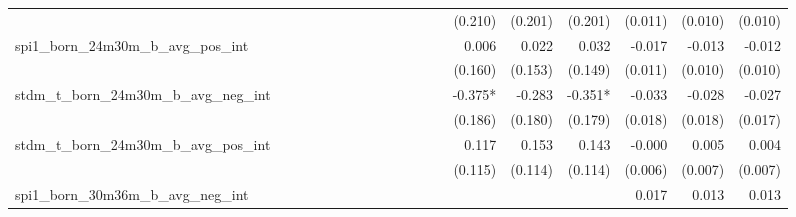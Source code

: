 \begin{tabular}{lrrrrrrrrrrrrrrrrrr}
                                            &              &              &              &              &              &              &              &              &               &              &              &               &      (0.210) &      (0.201) &       (0.201) &      (0.011) &      (0.010) &       (0.010) \\ 
spi1\_born\_24m30m\_b\_avg\_pos\_int        &              &              &              &              &              &              &              &              &               &              &              &               &        0.006 &        0.022 &         0.032 &       -0.017 &       -0.013 &        -0.012 \\ 
                                            &              &              &              &              &              &              &              &              &               &              &              &               &      (0.160) &      (0.153) &       (0.149) &      (0.011) &      (0.010) &       (0.010) \\ 
stdm\_t\_born\_24m30m\_b\_avg\_neg\_int     &              &              &              &              &              &              &              &              &               &              &              &               &      -0.375* &       -0.283 &       -0.351* &       -0.033 &       -0.028 &        -0.027 \\ 
                                            &              &              &              &              &              &              &              &              &               &              &              &               &      (0.186) &      (0.180) &       (0.179) &      (0.018) &      (0.018) &       (0.017) \\ 
stdm\_t\_born\_24m30m\_b\_avg\_pos\_int     &              &              &              &              &              &              &              &              &               &              &              &               &        0.117 &        0.153 &         0.143 &       -0.000 &        0.005 &         0.004 \\ 
                                            &              &              &              &              &              &              &              &              &               &              &              &               &      (0.115) &      (0.114) &       (0.114) &      (0.006) &      (0.007) &       (0.007) \\ 
spi1\_born\_30m36m\_b\_avg\_neg\_int        &              &              &              &              &              &              &              &              &               &              &              &               &              &              &               &        0.017 &        0.013 &         0.013 \\ 

\end{tabular}
